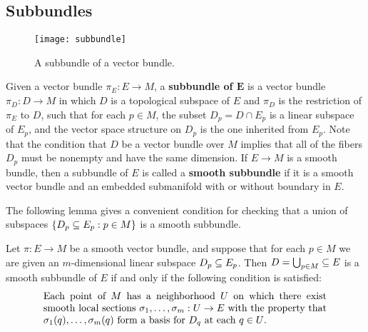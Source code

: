 \subsection{Subbundles}
\begin{figure}[htbp]
\centering
\texttt{[image: subbundle]}
\caption{A subbundle of a vector bundle.}
\end{figure}
Given a vector bundle $\pi_E:E\to M$, a \textbf{subbundle of $\bm{E}$} is a vector bundle $\pi_D:D\to M$ in which $D$ is a topological subspace of $E$ and $\pi_D$ is the restriction of $\pi_E$ to $D$, such that for each $p\in M$, the subset $D_p=D\cap E_p$ is a linear subspace of $E_p$, and the vector space structure on $D_p$ is the one inherited from $E_p$. Note that the condition that $D$ be a vector bundle over $M$ implies that all of the fibers $D_p$ must be nonempty and have the same dimension. If $E\to M$ is a smooth bundle, then a subbundle of $E$ is called a \textbf{smooth subbundle} if it is a smooth vector bundle and an embedded submanifold with or without boundary in $E$.\par
The following lemma gives a convenient condition for checking that a union of
subspaces $\{D_p\subseteq E_p:p\in M\}$ is a smooth subbundle.
\begin{lemma}\label{vector subbundle crit}
Let $\pi:E\to M$ be a smooth vector bundle, and suppose that for each $p\in M$ we are given an $m$-dimensional linear subspace $D_p\subseteq E_p$. Then $D=\bigcup_{p\in M}\subseteq E$ is a smooth subbundle of $E$ if and only if the following condition is satisfied: 
\begin{equation}\label{vector subbundle-1}
\parbox{\dimexpr\linewidth-6em}
{\strut
Each point of $M$ has a neighborhood $U$ on which there exist smooth local sections $\sigma_1,\dots,\sigma_m:U\to E$ with the property that $\sigma_1(q),\dots,\sigma_m(q)$ form a basis for $D_q$ at each $q\in U$.
\strut}
\end{equation}
\end{lemma}
